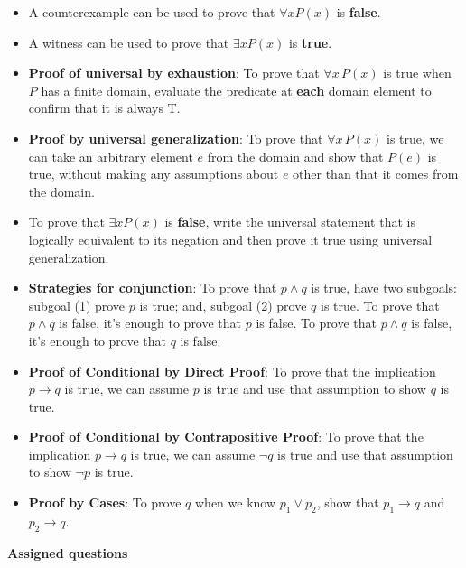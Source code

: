 \vspace{-10pt}

\begin{itemize}
    \item A counterexample can be used to prove that  $\forall x P(x)$ is {\bf false}.
    \item  A witness can be used  to  prove that  $\exists x P(x)$ is {\bf true}.
    \item {\bf Proof of universal by exhaustion}: To prove that $\forall x \, P(x)$
is true when $P$ has a finite domain, evaluate the predicate at {\bf each} domain element to confirm that it is always T.
    \item  {\bf Proof by universal generalization}: To prove that $\forall x \, P(x)$
is true, we can take an arbitrary element $e$ from the domain and show that $P(e)$ is true, without making any assumptions about $e$ other than that it comes from the domain.
    \item To  prove  that $\exists x P(x)$ is {\bf false}, write the universal statement that is logically equivalent to its negation and then prove it true using universal generalization.
    \item {\bf Strategies for conjunction}: To prove that $p \land q$ is true, have two subgoals: subgoal (1) prove $p$ 
is  true; and, subgoal (2) prove $q$ is true. To prove that $p \land q$ is false, it's enough to prove that $p$ is false.
 To prove that $p \land q$ is false, it's enough to prove that $q$ is false.
    \item {\bf Proof of Conditional by Direct Proof}: To prove that the implication $p \to q$ is true, we can assume $p$ is true and use that assumption to show $q$ is true.
    \item {\bf Proof of Conditional by Contrapositive Proof}: To prove that the implication $p \to q$ is true, we can assume $\neg q$ is true and use that assumption to show $\neg p$ is true.
    \item {\bf Proof by Cases}: To prove $q$ when we know $p_1 \lor p_2$, show that $p_1 \to q$ and $p_2 \to q$.
\end{itemize}


{\bf Assigned questions}

